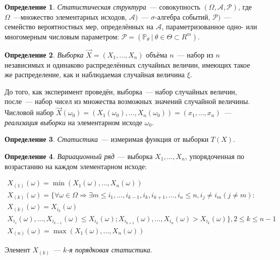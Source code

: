 \documentclass[oneside,final,14pt]{extreport}
\theoremstyle{definition}
\newtheorem{defn}{Определение}[section]
\begin{document}
\begin{defn}
{\it Статистическая структура}~--- совокупность \( (\Omega, \mathcal{A}, \mathcal{P}) \), где \( \Omega \)~---множество элементарных исходов, \( \mathcal{A} )\)~--- \( \sigma \)-алгебра событий, \( \mathcal{P}) \)~--- семейство вероятностных мер, определённых на \( \mathcal{A} \), параметризованное одно- или многомерным числовым параметром: \( \mathcal{P} = (\mathbb{P}_{\theta}~|~\theta \in \Theta \subset R^{m}) \).
\end{defn}

\begin{defn}
{\it Выборка} \( \vec{X} = (X_{1}, \ldots, X_{n}) \) объёма \( n \)~--- набор из \( n \) независимых и одинаково распределённых случайных величин, имеющих такое же распределение, как и наблюдаемая случайная величина \( \xi \).
\end{defn}

До того, как эксперимент проведён, выборка~--- набор случайных величин, после~--- набор чисел из множества возможных значений случайной величины. Числовой набор \( \vec{X}(\omega_0) = (X_{1}(\omega_0), \ldots, X_{n}(\omega_0)) = (x_1, \ldots, x_n) \)~--- {\it реализация выборки} на элементарном исходе \( \omega_0 \).

\begin{defn}
{\it Статистика}~--- измеримая функция от выборки \( T(X) \).
\end{defn}

\begin{defn}
{\it Вариационный ряд}~--- выборка \( X_{1}, \ldots, X_{n} \), упорядоченная по возрастанию на каждом элементарном исходе:
\end{defn}
\( \begin{array}{c}
X_{(1)}(\omega)=\min (X_{1}(\omega), \ldots, X_{n}(\omega)) \\
X_{(k)}(\omega)=\{\forall \omega \in \Omega \Rightarrow \exists m \leq i_{1}, \ldots, i_{k-1}, i_{k}, i_{k+1}, \ldots, i_{n} \leq n, i_{j} \neq i_{m}(j \neq m): \\ 
X_{(k)}(\omega)=X_{i_{k}}(\omega) \\
X_{i_{1}}(\omega), \ldots, X_{i_{k-1}}(\omega) \leq X_{i_{k}}(\omega); X_{i_{k+1}}(\omega), \ldots, X_{i_{n}}(\omega)>X_{i_{k}}(\omega)\}, 2 \leq k \leq n-1 \\
X_{(n)}(\omega)=\max (X_{1}(\omega), \ldots, X_{n}(\omega))
\end{array}
\)

Элемент \( X_{(k)} \)~--- {\it \( k\)-я порядковая статистика}.
\end{document}
